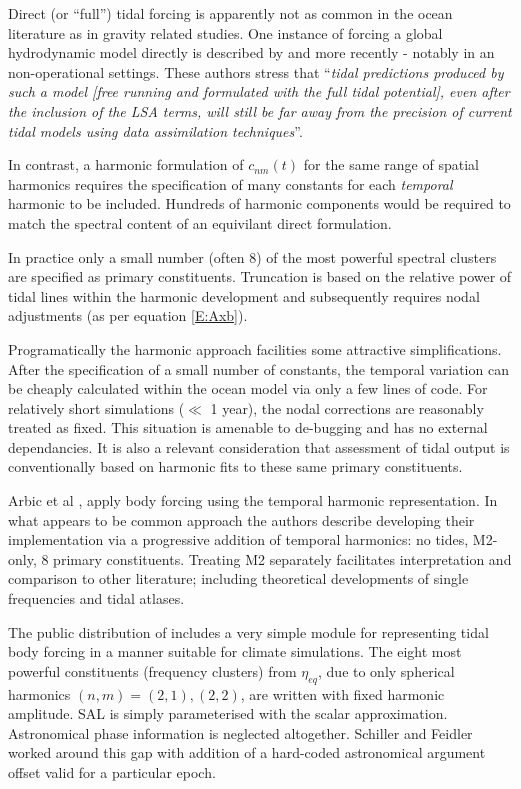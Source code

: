Direct (or ``full'') tidal forcing is apparently not as common in the ocean literature as in gravity related studies. One instance of forcing a global hydrodynamic model directly is described by \cite{Weis:2008ex} and more recently \cite{Logemann:2020} - notably in an non-operational settings.   These authors stress that ``\textit{tidal predictions produced by such a model [free running and formulated with the full tidal potential], even after the inclusion of the LSA terms, will still be far away from the precision of current tidal models using data assimilation techniques}''.

In contrast, a harmonic formulation of $c_{nm}(t)$ for the same range of spatial harmonics requires the specification of many constants for each \emph{temporal} harmonic to be included.  
Hundreds of harmonic components \citep[pp3]{Desai:2006wo} would be required to match the spectral content of an equivilant direct formulation.


In practice only a small number (often 8) of the most powerful spectral clusters are specified as primary constituents.  
Truncation is based on the relative power of tidal lines within the harmonic development and subsequently requires nodal adjustments (as per equation \ref{E:Axb}).

Programatically the harmonic approach facilities some attractive simplifications.  
After the specification of a small number of constants, the temporal variation can be cheaply calculated within the ocean model via only a few lines of code.   
For relatively short simulations ($\ll$ 1 year), the nodal corrections are reasonably treated as fixed.   This situation is amenable to de-bugging and has no external dependancies.
It is also a relevant consideration that assessment of tidal output is conventionally based on harmonic fits to these same primary constituents.

Arbic et al \citep{Arbic:2010us}, apply body forcing using the temporal harmonic representation. In what appears to be common approach the authors describe developing their implementation via a progressive addition of temporal harmonics: no tides, M2-only, 8 primary constituents.  Treating M2 separately facilitates interpretation and comparison to other literature; including theoretical developments of single frequencies and tidal atlases.


The public distribution of \MOM{} includes a very simple module for representing tidal body forcing in a manner suitable for climate simulations\cite[pp263] {Griffies:2008vh}.
The eight most powerful constituents (frequency clusters) from $\eta_{eq}$, due to only spherical harmonics $(n,m) = (2,1) , (2,2)$, are written with fixed harmonic amplitude.  SAL is simply parameterised with the scalar approximation. 
Astronomical phase information is neglected altogether.
Schiller and Feidler \citep{Schiller:2007gk} worked around this gap with addition of a hard-coded astronomical argument offset valid for a particular epoch.

